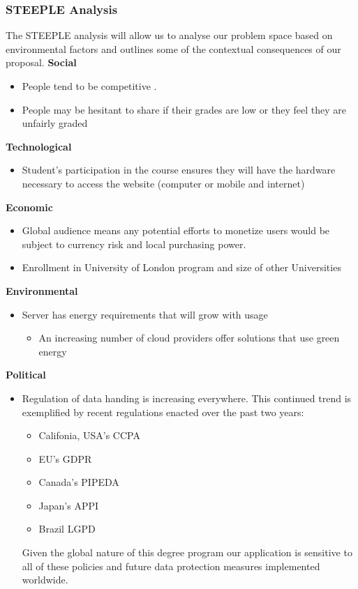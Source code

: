 \subsubsection{STEEPLE Analysis}
The STEEPLE analysis will allow us to analyse our problem space based on environmental factors and outlines some of the contextual consequences of our proposal.
\textbf{Social}
\begin{itemize}
    \item People tend to be competitive \cite{hutson_2015}.
    \item People may be hesitant to share if their grades are low or they feel they are unfairly graded
\end{itemize}
\textbf{Technological}
\begin{itemize}
    \item Student's participation in the course ensures they will have the hardware necessary to access the website (computer or mobile and internet)
\end{itemize}
\textbf{Economic}
\begin{itemize}
    \item Global audience means any potential efforts to monetize users would be subject to currency risk and local purchasing power.
    \item Enrollment in University of London program and size of other Universities
\end{itemize}
\textbf{Environmental}
\begin{itemize}
    \item Server has energy requirements that will grow with usage
    \begin{itemize}
        \item An increasing number of cloud providers offer solutions that use green energy
\end{itemize}
\end{itemize}
\textbf{Political}
\begin{itemize}
    \item Regulation of data handing is increasing everywhere. This continued trend is exemplified by recent regulations enacted over the past two years:
    \begin{itemize}
        \item Califonia, USA's CCPA
        \item EU's GDPR
        \item Canada's PIPEDA
        \item Japan's APPI 
        \item Brazil LGPD
    \end{itemize}
    Given the global nature of this degree program our application is sensitive to all of these policies and future data protection measures implemented worldwide.
\end{itemize}
